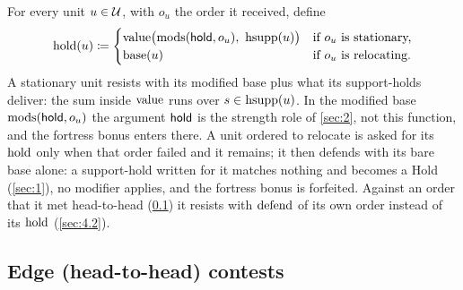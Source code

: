 \documentclass[12pt,a4paper]{article}
\begin{document}
For every unit $u \in \mathcal{U}$, with $o_u$ the order it received, define
\[
\operatorname{hold}(u) \coloneqq
\begin{cases}
\operatorname{value}\bigl(\operatorname{mods}(\mathsf{hold}, o_u),\ \operatorname{hsupp}(u)\bigr) & \text{if } o_u \text{ is stationary,} \\
\operatorname{base}(u) & \text{if } o_u \text{ is relocating.}
\end{cases}
\]
A stationary unit resists with its modified base plus what its support-holds deliver: the sum inside $\operatorname{value}$ runs over $s \in \operatorname{hsupp}(u)$.
In the modified base $\operatorname{mods}(\mathsf{hold}, o_u)$ the argument $\mathsf{hold}$ is the strength role of \cref{sec:2}, not this function, and the fortress bonus enters there.
A unit ordered to relocate is asked for its $\operatorname{hold}$ only when that order failed and it remains; it then defends with its bare base alone: a support-hold written for it matches nothing and becomes a Hold (\cref{sec:1}), no modifier applies, and the fortress bonus is forfeited.
Against an order that it met head-to-head (\cref{sec:4.1}) it resists with $\operatorname{defend}$ of its own order instead of its $\operatorname{hold}$ (\cref{sec:4.2}).

\subsection{Edge (head-to-head) contests}\label{sec:4.1}
\end{document}
